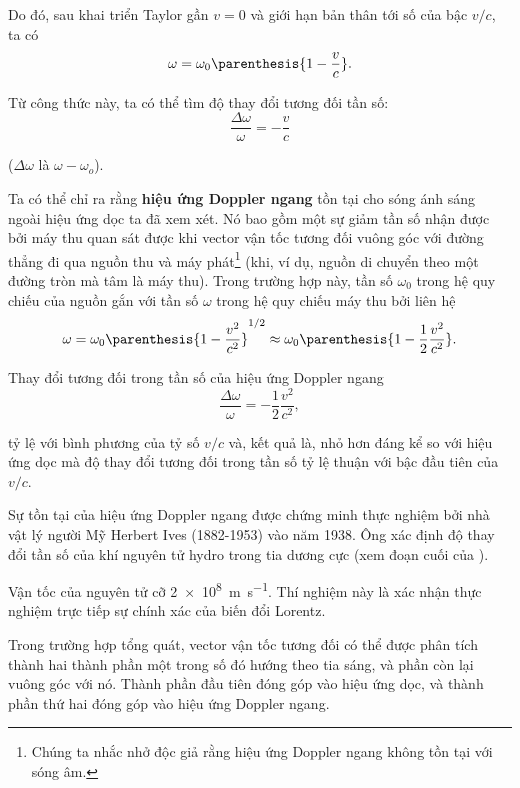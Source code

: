 \noindent
Do đó, sau khai triển Taylor gần $v=0$ và giới hạn bản thân tới số của bậc $v/c$, ta có
\begin{equation}\label{eq:21_14}
	\omega = \omega_0 \parenthesis{1 - \frac{v}{c}}.
\end{equation}

\noindent
Từ công thức này, ta có thể tìm độ thay đổi tương đối tần số:
\begin{equation}\label{eq:21_15}
	\frac{\Delta{\omega}}{\omega} = - \frac{v}{c}
\end{equation}

\noindent
($\Delta{\omega}$ là $\omega-\omega_o$).

Ta có thể chỉ ra rằng \textbf{hiệu ứng Doppler ngang} tồn tại cho sóng ánh sáng ngoài hiệu ứng dọc ta đã xem xét.
Nó bao gồm một sự giảm tần số nhận được bởi máy thu quan sát được khi vector vận tốc tương đối vuông góc với đường thẳng đi qua nguồn thu và máy phát\footnote{Chúng ta nhắc nhở độc giả rằng hiệu ứng Doppler ngang không tồn tại với sóng âm.} (khi, ví dụ, nguồn di chuyển theo một đường tròn mà tâm là máy thu).
Trong trường hợp này, tần số $\omega_0$ trong hệ quy chiếu của nguồn gắn với tần số $\omega$ trong hệ quy chiếu máy thu bởi liên hệ
\begin{equation}\label{eq:21_16}
	\omega = \omega_0 \parenthesis{1 - \frac{v^2}{c^2}}^{1/2} \approx \omega_0 \parenthesis{1 - \frac{1}{2} \frac{v^2}{c^2}}.
\end{equation}

Thay đổi tương đối trong tần số của hiệu ứng Doppler ngang
\begin{equation}\label{eq:21_17}
	\frac{\Delta{\omega}}{\omega} = - \frac{1}{2} \frac{v^2}{c^2},
\end{equation}

\noindent
tỷ lệ với bình phương của tỷ số $v/c$ và, kết quả là, nhỏ hơn đáng kể so với hiệu ứng dọc mà 
độ thay đổi tương đối trong tần số tỷ lệ thuận với bậc đầu tiên của $v/c$.

Sự tồn tại của hiệu ứng Doppler ngang được chứng minh thực nghiệm bởi nhà vật lý người Mỹ Herbert Ives (1882-1953) vào năm 1938.
Ông xác định độ thay đổi tần số của khí nguyên tử hydro trong tia dương cực (xem đoạn cuối của ).

Vận tốc của nguyên tử cỡ \SI{2e8}{m.s^{-1}}.
Thí nghiệm này là xác nhận thực nghiệm trực tiếp sự chính xác của biến đổi Lorentz.

Trong trường hợp tổng quát, vector vận tốc tương đối có thể được phân tích thành hai thành phần một trong số đó hướng theo tia sáng, và phần còn lại vuông góc với nó.
Thành phần đầu tiên đóng góp vào hiệu ứng dọc, và thành phần thứ hai đóng góp vào hiệu ứng Doppler ngang.

